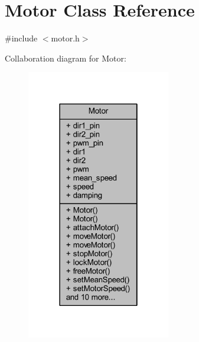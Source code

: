 \hypertarget{class_motor}{}\section{Motor Class Reference}
\label{class_motor}


{\ttfamily \#include $<$motor.\+h$>$}



Collaboration diagram for Motor\+:\nopagebreak
\begin{figure}[H]
\begin{center}
\leavevmode
\includegraphics[width=178pt]{class_motor__coll__graph}
\end{center}
\end{figure}
